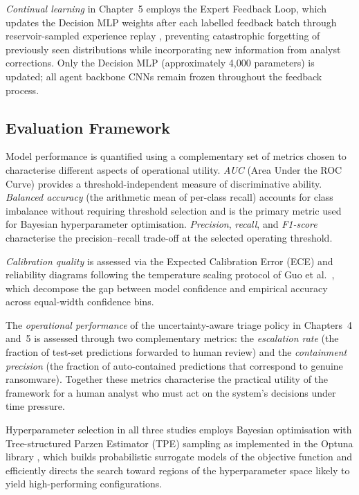 \emph{Continual learning} in Chapter~5 employs the Expert Feedback Loop, which updates the
Decision MLP weights after each labelled feedback batch through reservoir-sampled experience
replay \cite{rolnick2019experience}, preventing catastrophic forgetting of previously seen
distributions while incorporating new information from analyst corrections.
Only the Decision MLP (approximately 4,000 parameters) is updated; all agent backbone CNNs
remain frozen throughout the feedback process.

\subsection{Evaluation Framework}
\label{sec:eval_framework}

Model performance is quantified using a complementary set of metrics chosen to characterise
different aspects of operational utility.
\emph{AUC} (Area Under the ROC Curve) provides a threshold-independent measure of
discriminative ability.
\emph{Balanced accuracy} (the arithmetic mean of per-class recall) accounts for class
imbalance without requiring threshold selection and is the primary metric used for
Bayesian hyperparameter optimisation.
\emph{Precision}, \emph{recall}, and \emph{F1-score} characterise the precision--recall
trade-off at the selected operating threshold.

\emph{Calibration quality} is assessed via the Expected Calibration Error (ECE) and
reliability diagrams following the temperature scaling protocol of Guo et al.\
\cite{guo2017calibration}, which decompose the gap between model confidence and empirical
accuracy across equal-width confidence bins.

The \emph{operational performance} of the uncertainty-aware triage policy in Chapters~4 and~5
is assessed through two complementary metrics: the \emph{escalation rate} (the fraction of
test-set predictions forwarded to human review) and the \emph{containment precision} (the
fraction of auto-contained predictions that correspond to genuine ransomware).
Together these metrics characterise the practical utility of the framework for a human analyst
who must act on the system's decisions under time pressure.

Hyperparameter selection in all three studies employs Bayesian optimisation with
Tree-structured Parzen Estimator (TPE) sampling as implemented in the Optuna
library \cite{optuna2019}, which builds probabilistic surrogate models of the objective
function and efficiently directs the search toward regions of the hyperparameter space likely
to yield high-performing configurations.

